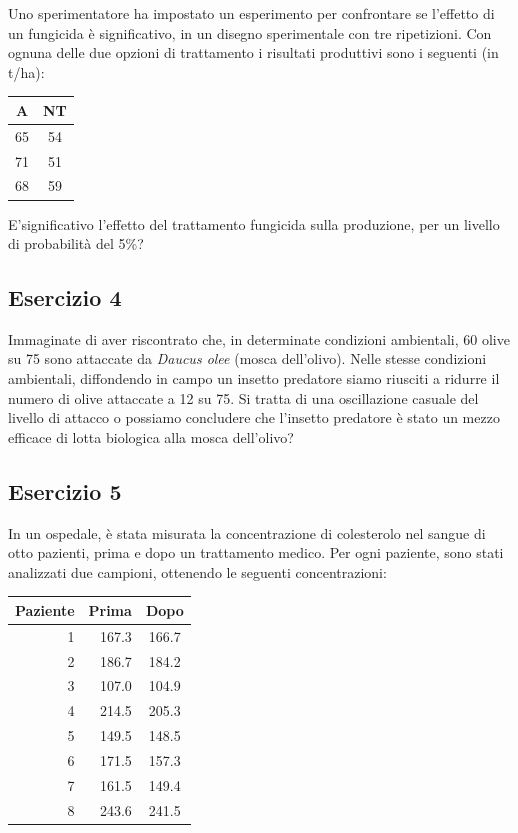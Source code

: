 \documentclass[a4paper,12pt,oneside]{book}
\begin{document}
Uno sperimentatore ha impostato un esperimento per confrontare se l'effetto di un fungicida è significativo, in un disegno sperimentale con tre ripetizioni. Con ognuna delle due opzioni di trattamento i risultati produttivi sono i seguenti (in t/ha):

\begin{longtable}[]{@{}cc@{}}
\toprule
A & NT \\
\midrule
\endhead
65 & 54 \\
71 & 51 \\
68 & 59 \\
\bottomrule
\end{longtable}

E'significativo l'effetto del trattamento fungicida sulla produzione, per un livello di probabilità del 5\%?

\hypertarget{esercizio-4-4}{%
\subsection{Esercizio 4}\label{esercizio-4-4}}

Immaginate di aver riscontrato che, in determinate condizioni ambientali, 60 olive su 75 sono attaccate da \emph{Daucus olee} (mosca dell'olivo). Nelle stesse condizioni ambientali, diffondendo in campo un insetto predatore siamo riusciti a ridurre il numero di olive attaccate a 12 su 75. Si tratta di una oscillazione casuale del livello di attacco o possiamo concludere che l'insetto predatore è stato un mezzo efficace di lotta biologica alla mosca dell'olivo?

\hypertarget{esercizio-5-4}{%
\subsection{Esercizio 5}\label{esercizio-5-4}}

In un ospedale, è stata misurata la concentrazione di colesterolo nel sangue di otto pazienti, prima e dopo un trattamento medico. Per ogni paziente, sono stati analizzati due campioni, ottenendo le seguenti concentrazioni:

\begin{longtable}[]{@{}rrc@{}}
\toprule
Paziente & Prima & Dopo \\
\midrule
\endhead
1 & 167.3 & 166.7 \\
2 & 186.7 & 184.2 \\
3 & 107.0 & 104.9 \\
4 & 214.5 & 205.3 \\
5 & 149.5 & 148.5 \\
6 & 171.5 & 157.3 \\
7 & 161.5 & 149.4 \\
8 & 243.6 & 241.5 \\
\bottomrule
\end{longtable}
\end{document}
